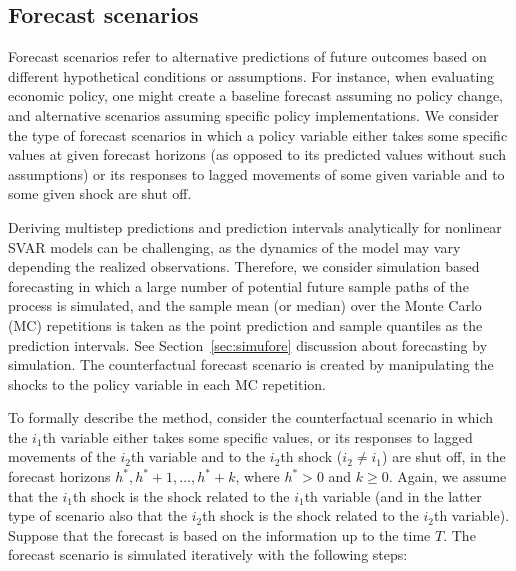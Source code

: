 \documentclass[nojss]{jss}
\begin{document}
\subsection{Forecast scenarios}\label{sec:forescen}

Forecast scenarios refer to alternative predictions of future outcomes based on different hypothetical conditions or assumptions. For instance, when evaluating economic policy, one might create a baseline forecast assuming no policy change, and alternative scenarios assuming specific policy implementations. We consider the type of forecast scenarios in which a policy variable either takes some specific values at given forecast horizons (as opposed to its predicted values without such assumptions) or its responses to lagged movements of some given variable and to some given shock are shut off.

Deriving multistep predictions and prediction intervals analytically for nonlinear SVAR models can be challenging, as the dynamics of the model may vary depending the realized observations. Therefore, we consider simulation based forecasting in which a large number of potential future sample paths of the process is simulated, and the sample mean (or median) over the Monte Carlo (MC) repetitions is taken as the point prediction and sample quantiles as the prediction intervals. See Section~\ref{sec:simufore} discussion about forecasting by simulation. The counterfactual forecast scenario is created by manipulating the shocks to the policy variable in each MC repetition.

To formally describe the method, consider the counterfactual scenario in which the $i_1$th variable either takes some specific values, or its responses to lagged movements of the $i_2$th variable and to the $i_2$th shock ($i_2\neq i_1$) are shut off, in the forecast horizons $h^*, h^*+1,...,h^*+k$, where $h^*>0$ and $k\geq 0$. Again, we assume that the $i_1$th shock is the shock related to the $i_1$th variable (and in the latter type of scenario also that the $i_2$th shock is the shock related to the $i_2$th variable). Suppose that the forecast is based on the information up to the time $T$. The forecast scenario is simulated iteratively with the following steps:
\end{document}
